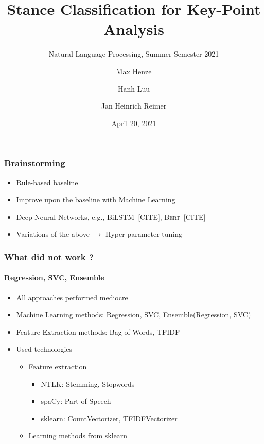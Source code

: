 \documentclass[english,handout]{mlutalk}
\title{Stance Classification for Key-Point Analysis}
\subtitle{Natural Language Processing, Summer Semester 2021}
\author{Max Henze \and Hanh Luu \and Jan Heinrich Reimer}
\institute{Martin Luther University Halle-Wittenberg}
\date{April 20, 2021}
\newcommand{\Bert}{\textsc{Bert}\xspace}
\newcommand{\BiLSTM}{\mbox{BiLSTM}\xspace}
\newcommand{\todocite}{{\smaller\color{red}[CITE]}\xspace}
\begin{document}
\titleframe

\begin{frame}
  \frametitle{Brainstorming}

  \begin{itemize}
    \item Rule-based baseline
    \item Improve upon the baseline with Machine Learning
    \item Deep Neural Networks, e.g., \BiLSTM~\todocite, \Bert~\todocite
    \item Variations of the above \(\to\) Hyper-parameter tuning
  \end{itemize}

\end{frame}

\begin{frame}
  \frametitle{What did not work ?}
  \framesubtitle{Regression, SVC, Ensemble}
    \begin{itemize}
      \item All approaches performed mediocre
      \item Machine Learning methods: Regression, SVC, Ensemble(Regression, SVC)
      \item Feature Extraction methods: Bag of Words, TFIDF
      \item Used technologies
      		\begin{itemize}
    		\item Feature extraction
    		\begin{itemize}
    			\item NTLK: Stemming, Stopwords
    			\item spaCy: Part of Speech
    			\item sklearn: CountVectorizer, TFIDFVectorizer
    		\end{itemize}
    		\item Learning methods from sklearn
    	\end{itemize}
    \end{itemize}
  

\end{frame}
\end{document}
